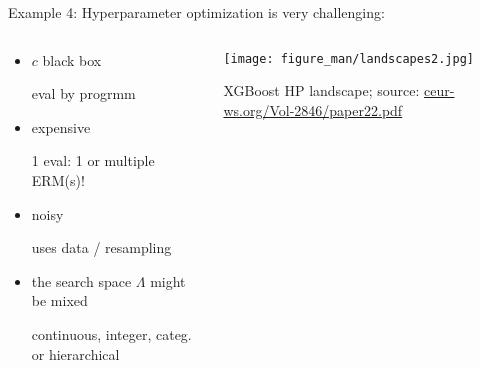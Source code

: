 \documentclass[11pt,compress,t,notes=noshow, xcolor=table]{beamer}
\begin{document}
\begin{vbframe}{Example 4: Hyperparameter optimization}
is very challenging:  
\vspace*{-0.2cm} 
\begin{columns}
	\begin{column}{0.6\textwidth}
	\begin{itemize}
		\item $c$ black box \\
		\begin{footnotesize}eval by progrmm\end{footnotesize}
		\item expensive \\
		\begin{footnotesize}
		1 eval: 1 or multiple ERM(s)!
		\end{footnotesize}
		\item noisy \\
		\begin{footnotesize}
		uses data / resampling
		\end{footnotesize}
  		\item the search space $\Lambda$ might be mixed 
		\begin{footnotesize}
		continuous, integer, categ. or hierarchical
		\end{footnotesize}
	\end{itemize}
	\end{column}
 	\begin{column}{0.35\textwidth}
		\begin{center}
			\texttt{[image: figure\_man/landscapes2.jpg]}
\begin{tiny}{XGBoost HP landscape; source: \url{ceur-ws.org/Vol-2846/paper22.pdf}}\end{tiny}
		\end{center}
  \end{column}
\end{columns}
\end{vbframe}
\end{document}
